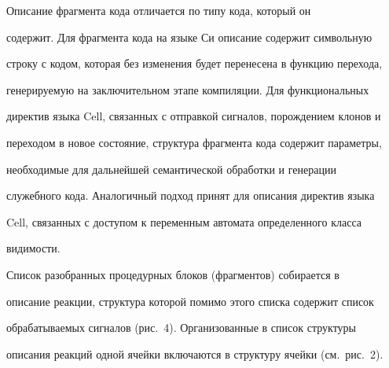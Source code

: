       


      Описание фрагмента кода отличается по типу кода, который он 


содержит. Для фрагмента кода на языке Си описание содержит символьную 


строку с кодом, которая без изменения будет перенесена в функцию перехода, 


генерируемую на заключительном этапе компиляции. Для функциональных 


директив языка Cell, связанных с отправкой сигналов, порождением клонов и 


переходом в новое состояние, структура фрагмента кода содержит параметры, 


необходимые для дальнейшей семантической обработки и генерации 


служебного кода. Аналогичный подход принят для описания директив языка 


Cell, связанных с доступом к переменным автомата определенного класса 


видимости.


      


      Список разобранных процедурных блоков (фрагментов) собирается в 


описание реакции, структура которой помимо этого списка содержит список 


обрабатываемых сигналов (рис.~4). Организованные в список структуры 


описания реакций одной ячейки включаются в структуру ячейки (см.\ рис.~2).





